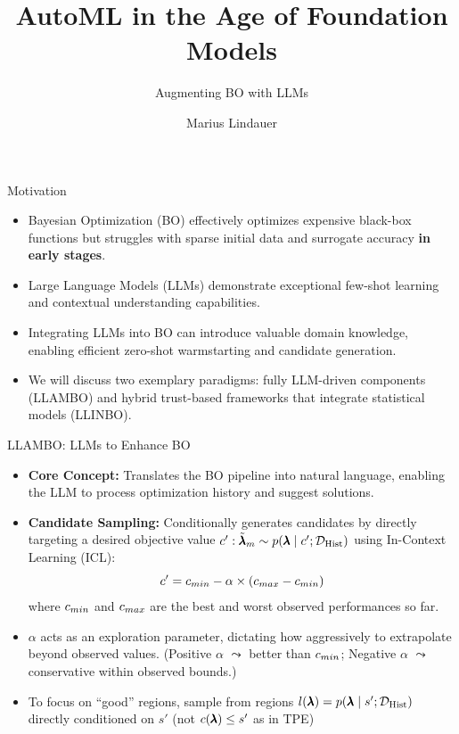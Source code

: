 \documentclass[main]{subfiles}
\title[AutoML in the Age of Foundation Models]{AutoML in the Age of Foundation Models}
\subtitle{Augmenting BO with LLMs}
\author[Marius Lindauer]{Marius Lindauer}
\date{}
\begin{document}
	
	\maketitle
	

\begin{frame}{Motivation}
    \begin{itemize}
        \item Bayesian Optimization (BO) effectively optimizes expensive black-box functions but struggles with sparse initial data and surrogate accuracy \textbf{in early stages}.
        \item Large Language Models (LLMs) demonstrate exceptional few-shot learning and contextual understanding capabilities.
        \item Integrating LLMs into BO can introduce valuable domain knowledge, enabling efficient zero-shot warmstarting and candidate generation.
        \item We will discuss two exemplary paradigms: fully LLM-driven components (LLAMBO) and hybrid trust-based frameworks that integrate statistical models (LLINBO).
    \end{itemize}
\end{frame}

\begin{frame}{LLAMBO: LLMs to Enhance BO }
    \begin{itemize}
        \item \textbf{Core Concept:} Translates the BO pipeline into natural language, enabling the LLM to process optimization history and suggest solutions.
        \item \textbf{Candidate Sampling:} Conditionally generates candidates by directly targeting a desired objective value $c{}': \tilde{\pmb{\lambda}}_m \sim p(\pmb{\lambda} \mid c{}'; \mathcal{D}_{\text{Hist}})$ using In-Context Learning (ICL):
        \begin{equation*}
            c^{\prime} = c_{min} - \alpha \times (c_{max} - c_{min})
        \end{equation*}
        where $c_{min}$ and $c_{max}$ are the best and worst observed performances so far.
        \item $\alpha$ acts as an exploration parameter, dictating how aggressively to extrapolate beyond observed values. (Positive $\alpha$ $\leadsto$ better than $c_{min}$; Negative $\alpha$ $\leadsto$ conservative within observed bounds.)
        \item[$\leadsto$] To focus on ``good'' regions, sample from regions $l(\pmb{\lambda}) = p(\pmb{\lambda} \mid s'; \mathcal{D}_{\text{Hist}})$ directly conditioned on $s'$ (not $c(\pmb{\lambda}) \leq s'$ as in TPE)
    \end{itemize}
\end{frame}
\end{document}
